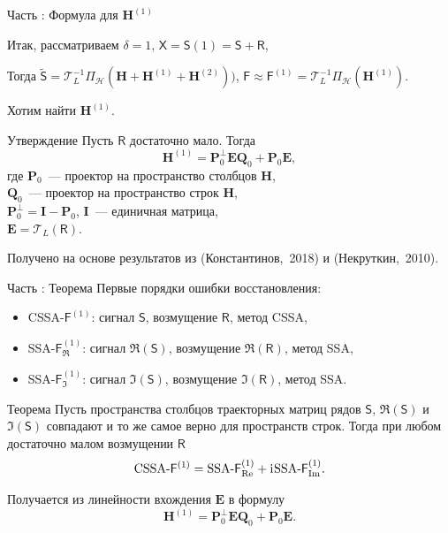 \documentclass[10pt, ucs, notheorems, handout]{beamer}
\newcommand{\tX}[1]{\mathsf{#1}}
\newcommand{\iu}{\mathrm{i}\mkern1mu}
\newcommand{\RomanNumeralCaps}[1]
{\MakeUppercase{\romannumeral #1}}
\begin{document}
\begin{frame}{Часть \RomanNumeralCaps{2}: Формула для $\mathbf{H}^{(1)}$}

Итак, рассматриваем $\delta = 1$,
$\tX{X} = \tX{S}(1) = \tX{S} + \tX{R}$,

Тогда
$\tilde{\tX{S}} = \mathcal{T}_L^{-1} \Pi_{\mathcal{H}} (\mathbf{H} + \mathbf{H}^{(1)} + \mathbf{H}^{(2)}))$, $\tX{F} \approx \tX{F}^{(1)} = \mathcal{T}_L^{-1} \Pi_{\mathcal{H}}(\mathbf{H}^{(1)})$.

Хотим найти $\mathbf{H}^{(1)}$.\\

\begin{block}{Утверждение}
	Пусть $\tX{R}$ достаточно мало. Тогда
	\begin{equation*} \label{eq:main}
		\mathbf{H}^{(1)} = \mathbf{P}^{\perp}_0 \mathbf{E} \mathbf{Q}_0 + \mathbf{P}_0 \mathbf{E},
	\end{equation*}
	где $\mathbf{P}_0$~--- проектор на пространство столбцов $\mathbf{H}$, \\$\mathbf{Q}_0$~--- проектор на пространство строк $\mathbf{H}$,\\ $\mathbf{P}^{\perp}_0 = \mathbf{I} - \mathbf{P}_0$, $\mathbf{I}$~--- единичная матрица,\\
	$\mathbf{E} = \mathcal{T}_L(\tX{R})$.
\end{block}
Получено на основе результатов из (Константинов,~2018) и (Некруткин,~2010).
\end{frame}

\begin{frame}{Часть \RomanNumeralCaps{2}: Теорема}
	Первые порядки ошибки восстановления:
	\begin{itemize}
	\item CSSA-$\tX{F}^{(1)}$: сигнал $\tX{S}$, возмущение $\tX{R}$, метод CSSA,
	\item SSA-$\tX{F}^{(1)}_{\Re}$: сигнал $\Re(\tX{S})$, возмущение $\Re(\tX{R})$, метод SSA,	
	\item SSA-$\tX{F}^{(1)}_{\Im}$: сигнал $\Im(\tX{S})$, возмущение $\Im(\tX{R})$, метод SSA.
	\end{itemize}

    \begin{block}{Теорема \label{th:sum}}
        Пусть пространства столбцов траекторных матриц рядов $\tX{S}$, $\Re(\tX{S})$ и $\Im(\tX{S})$ совпадают и то же самое верно для пространств строк.
    Тогда при любом достаточно малом возмущении $\tX{R}$
    $$\text{CSSA-}\tX{F}^{(1)} = \text{SSA-}\tX{F}^{(1)}_{\Re} + \iu\text{SSA-}\tX{F}^{(1)}_{\Im}.$$
    \end{block}
    Получается из линейности вхождения $\mathbf{E}$ в формулу
    $$\mathbf{H}^{(1)} = \mathbf{P}^{\perp}_0 \mathbf{E} \mathbf{Q}_0 + \mathbf{P}_0 \mathbf{E}.$$
\end{frame}
\end{document}
